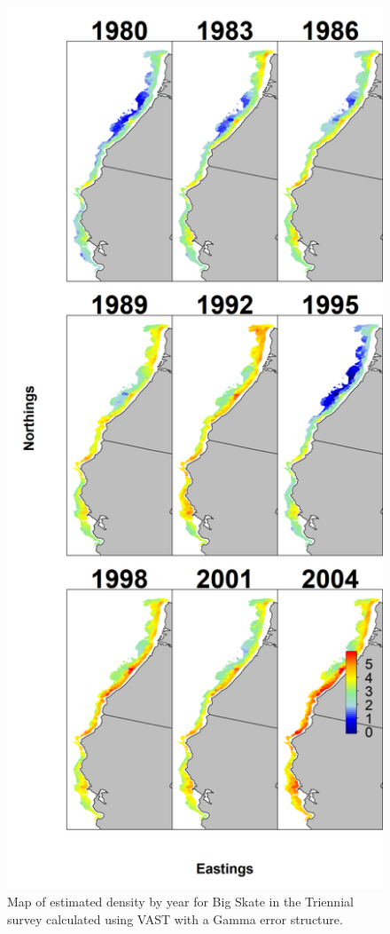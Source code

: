 \documentclass[]{article}
\begin{document}
\begin{figure}
\centering
\includegraphics{Figures/VAST_Yearly_Dens_Triennial.png}
\caption{Map of estimated density by year for Big Skate in the Triennial
survey calculated using VAST with a Gamma error
structure.\label{fig:VAST_Yearly_Dens_Triennial}}
\end{figure}
\end{document}

